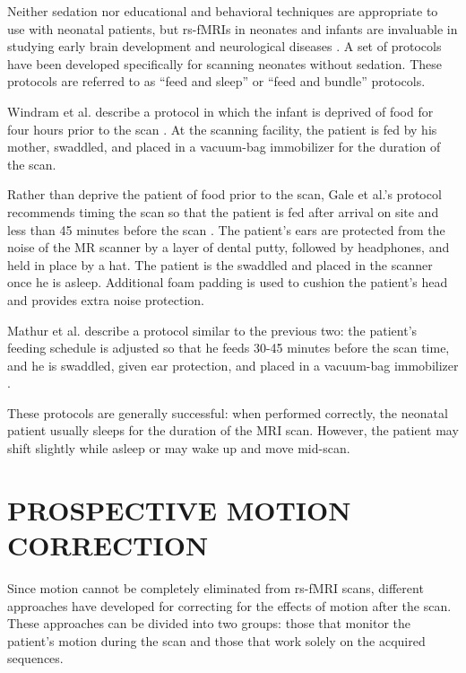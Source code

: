 Neither sedation nor educational and behavioral techniques are appropriate to use with neonatal patients, but rs-fMRIs in neonates and infants are invaluable  in studying early brain development and neurological diseases \cite{Smyser2015}. A set of protocols have been developed specifically for scanning neonates without sedation. These protocols are referred to as ``feed and sleep'' or ``feed and bundle'' protocols.

Windram et al. describe a protocol in which the infant is deprived of food for four hours prior to the scan \cite{Windram2011}. At the scanning facility, the patient is fed by his mother, swaddled, and placed in a vacuum-bag immobilizer for the duration of the scan. 

Rather than deprive the patient of food prior to the scan, Gale et al.'s protocol recommends timing the scan so that the patient is fed after arrival on site and less than 45 minutes before the scan \cite{Gale2013}. The patient's ears are protected from the noise of the MR scanner by a layer of dental putty, followed by headphones, and held in place by a hat. The patient is the swaddled and placed in the scanner once he is asleep. Additional foam padding is used to cushion the patient's head and provides extra noise protection.

Mathur et al. describe a protocol similar to the previous two: the patient's feeding schedule is adjusted so that he feeds 30-45 minutes before the scan time, and he is swaddled, given ear protection, and placed in a vacuum-bag immobilizer \cite{Mathur2008}.

These protocols are generally successful: when performed correctly, the neonatal patient usually sleeps for the duration of the MRI scan. However, the patient may shift slightly while asleep or may wake up and move mid-scan.


\section{PROSPECTIVE MOTION CORRECTION}

Since motion cannot be completely eliminated from rs-fMRI scans, different approaches have developed for correcting for the effects of motion after the scan. These approaches can be divided into two groups: those that monitor the patient's motion during the scan and those that work solely on the acquired sequences.

